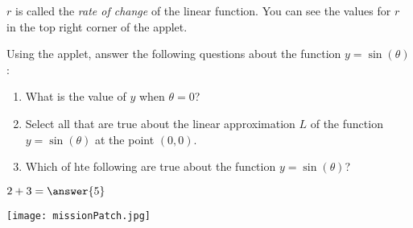 \documentclass{ximera}
\begin{document}
$r$ is called the \textit{rate of change} of the linear function. You can see the values for $r$ in the top right corner of the applet. 

Using the applet, answer the following questions about the function $y=\sin(\theta)$:

\begin{enumerate}
    \item What is the value of $y$ when $\theta=0$? 
    \begin{multipleChoice}
        \choice{$\pi$}
    \end{multipleChoice}
    \item Select all that are true about the linear approximation $L$ of the function $y=\sin(\theta)$ at the point $(0,0)$.
    \begin{selectAll}
    \end{selectAll}
    \item Which of hte following are true about the function $y=\sin(\theta)$?
\end{enumerate}


\begin{exercise}
    $2+3=\answer{5}$
\end{exercise}

\begin{center} %
\texttt{[image: missionPatch.jpg]}
\end{center}
\end{document}
